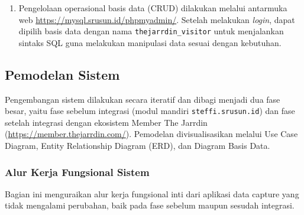 \begin{enumerate}[label=\alph*.]
    \item Pengelolaan operasional basis data (CRUD) dilakukan melalui antarmuka web \url{https://mysql.srusun.id/phpmyadmin/}. Setelah melakukan \textit{login}, dapat dipilih basis data dengan nama \texttt{thejarrdin\_visitor} untuk menjalankan sintaks SQL guna melakukan manipulasi data sesuai dengan kebutuhan.
\end{enumerate}



    
\subsection{Pemodelan Sistem}
Pengembangan sistem dilakukan secara iteratif dan dibagi menjadi dua fase besar, yaitu fase sebelum integrasi (modul mandiri \texttt{steffi.srusun.id}) dan fase setelah integrasi dengan ekosistem {Member} The Jarrdin (\url{https://member.thejarrdin.com/}). Pemodelan divisualisasikan melalui {Use Case Diagram}, {Entity Relationship Diagram} (ERD), dan Diagram Basis Data.


\subsubsection{Alur Kerja Fungsional Sistem}
Bagian ini menguraikan alur kerja fungsional inti dari aplikasi {data capture} yang tidak mengalami perubahan, baik pada fase sebelum maupun sesudah integrasi.

